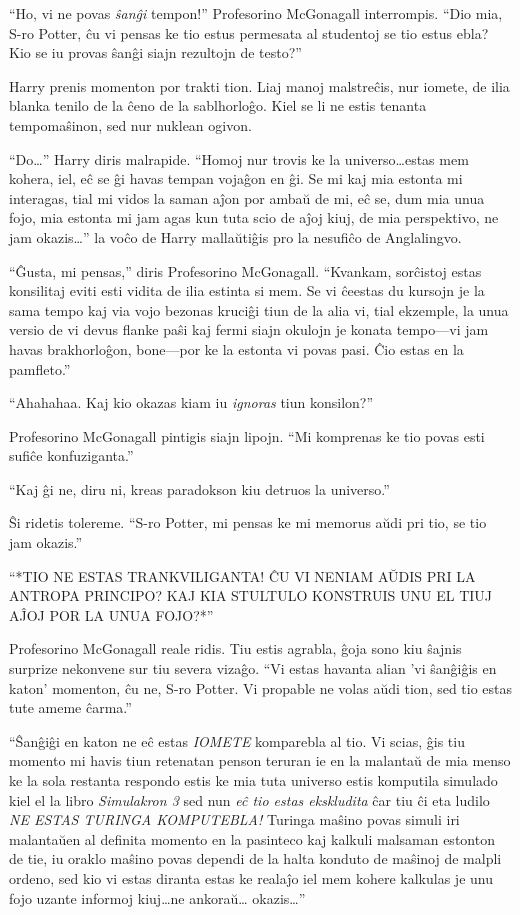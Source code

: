 ``Ho, vi ne povas \emph{ŝanĝi} tempon!'' Profesorino McGonagall
interrompis. ``Dio mia, S-ro Potter, ĉu vi pensas ke tio estus
permesata al studentoj se tio estus ebla? Kio se iu provas ŝanĝi siajn
rezultojn de testo?''

Harry prenis momenton por trakti tion. Liaj manoj malstreĉis, nur
iomete, de ilia blanka tenilo de la ĉeno de la sablhorloĝo. Kiel se li
ne estis tenanta tempomaŝinon, sed nur nuklean ogivon.

``Do\ldots'' Harry diris malrapide. ``Homoj nur trovis ke la
universo\ldots estas mem kohera, iel, eĉ se ĝi havas tempan vojaĝon en
ĝi. Se mi kaj mia estonta mi interagas, tial mi vidos la saman aĵon por
ambaŭ de mi, eĉ se, dum mia unua fojo, mia estonta mi jam agas
kun tuta scio de aĵoj kiuj, de mia perspektivo, ne jam okazis\ldots''
la voĉo de Harry mallaŭtiĝis pro la nesufiĉo de Anglalingvo.

``Ĝusta, mi pensas,'' diris Profesorino McGonagall. ``Kvankam,
sorĉistoj estas konsilitaj eviti esti vidita de ilia estinta si
mem. Se vi ĉeestas du kursojn je la sama tempo kaj via vojo bezonas
kruciĝi tiun de la alia vi, tial ekzemple, la unua versio de vi devus
flanke paŝi kaj fermi siajn okulojn je konata tempo—vi jam havas
brakhorloĝon, bone—por ke la estonta vi povas pasi. Ĉio estas en la
pamfleto.''

``Ahahahaa. Kaj kio okazas kiam iu \emph{ignoras} tiun konsilon?''

Profesorino McGonagall pintigis siajn lipojn. ``Mi komprenas ke tio
povas esti sufiĉe konfuziganta.''

``Kaj ĝi ne, diru ni, kreas paradokson kiu detruos la universo.''

Ŝi ridetis tolereme. ``S-ro Potter, mi pensas ke mi memorus aŭdi pri
tio, se tio jam okazis.''

``*TIO NE ESTAS TRANKVILIGANTA! ĈU VI NENIAM AŬDIS PRI LA ANTROPA
PRINCIPO? KAJ KIA STULTULO KONSTRUIS UNU EL TIUJ AĴOJ POR LA UNUA
FOJO?*''

Profesorino McGonagall reale ridis. Tiu estis agrabla, ĝoja sono kiu
ŝajnis surprize nekonvene sur tiu severa vizaĝo. ``Vi estas havanta
alian 'vi ŝanĝiĝis en katon' momenton, ĉu ne, S-ro Potter. Vi propable
ne volas aŭdi tion, sed tio estas tute ameme ĉarma.''

``Ŝanĝiĝi en katon ne eĉ estas \emph{IOMETE} komparebla al tio. Vi
scias, ĝis tiu momento mi havis tiun retenatan penson teruran ie en la
malantaŭ de mia menso ke la sola restanta respondo estis ke mia tuta
universo estis komputila simulado kiel el la libro \emph{Simulakron 3}
sed nun \emph{eĉ tio estas ekskludita} ĉar tiu ĉi eta ludilo \emph{NE
ESTAS TURINGA KOMPUTEBLA!} Turinga maŝino povas simuli iri malantaŭen
al definita momento en la pasinteco kaj kalkuli malsaman estonton de
tie, iu oraklo maŝino povas dependi de la halta konduto de maŝinoj de
malpli ordeno, sed kio vi estas diranta estas ke realaĵo iel mem
kohere kalkulas je unu fojo uzante informoj kiuj\ldots ne ankoraŭ\ldots
okazis\ldots''

